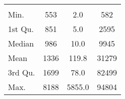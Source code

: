 \begin{tabular}{lS[table-format=5.1]S[table-format=5.1]S[table-format=5.1]}
&  &  &  \\
 Min.    & 553 & 2.0 & 582 \\
 1st Qu. & 851 & 5.0 & 2595 \\
 Median  & 986 & 10.0 & 9945 \\
 Mean    & 1336 & 119.8 & 31279 \\
 3rd Qu. & 1699 & 78.0 & 82499 \\
 Max.    & 8188 & 5855.0 & 94804 \\
\end{tabular}
